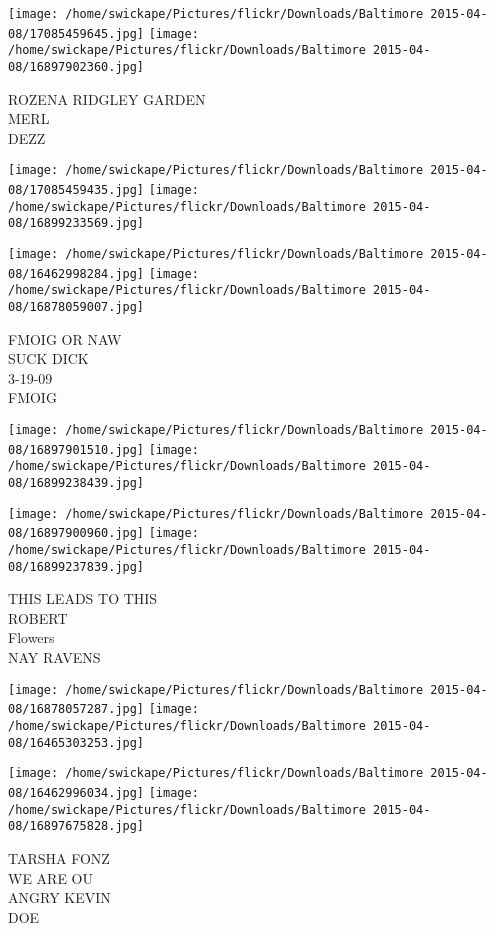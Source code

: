 \documentclass[10pt,letterpaper]{article}
\begin{document}
\vspace{0.25in}
\texttt{[image: /home/swickape/Pictures/flickr/Downloads/Baltimore 2015-04-08/17085459645.jpg]}
\texttt{[image: /home/swickape/Pictures/flickr/Downloads/Baltimore 2015-04-08/16897902360.jpg]}

ROZENA RIDGLEY GARDEN\\
MERL\\
DEZZ
\pagebreak

\texttt{[image: /home/swickape/Pictures/flickr/Downloads/Baltimore 2015-04-08/17085459435.jpg]}
\texttt{[image: /home/swickape/Pictures/flickr/Downloads/Baltimore 2015-04-08/16899233569.jpg]}

\texttt{[image: /home/swickape/Pictures/flickr/Downloads/Baltimore 2015-04-08/16462998284.jpg]}
\texttt{[image: /home/swickape/Pictures/flickr/Downloads/Baltimore 2015-04-08/16878059007.jpg]}

FMOIG OR NAW\\
SUCK DICK\\
3{-}19{-}09\\
FMOIG
\pagebreak

\texttt{[image: /home/swickape/Pictures/flickr/Downloads/Baltimore 2015-04-08/16897901510.jpg]}
\texttt{[image: /home/swickape/Pictures/flickr/Downloads/Baltimore 2015-04-08/16899238439.jpg]}

\texttt{[image: /home/swickape/Pictures/flickr/Downloads/Baltimore 2015-04-08/16897900960.jpg]}
\texttt{[image: /home/swickape/Pictures/flickr/Downloads/Baltimore 2015-04-08/16899237839.jpg]}

THIS LEADS TO THIS\\
ROBERT\\
Flowers\\
NAY RAVENS
\pagebreak

\texttt{[image: /home/swickape/Pictures/flickr/Downloads/Baltimore 2015-04-08/16878057287.jpg]}
\texttt{[image: /home/swickape/Pictures/flickr/Downloads/Baltimore 2015-04-08/16465303253.jpg]}

\texttt{[image: /home/swickape/Pictures/flickr/Downloads/Baltimore 2015-04-08/16462996034.jpg]}
\texttt{[image: /home/swickape/Pictures/flickr/Downloads/Baltimore 2015-04-08/16897675828.jpg]}

TARSHA FONZ\\
WE ARE OU\\
ANGRY KEVIN\\
DOE
\pagebreak
\end{document}
